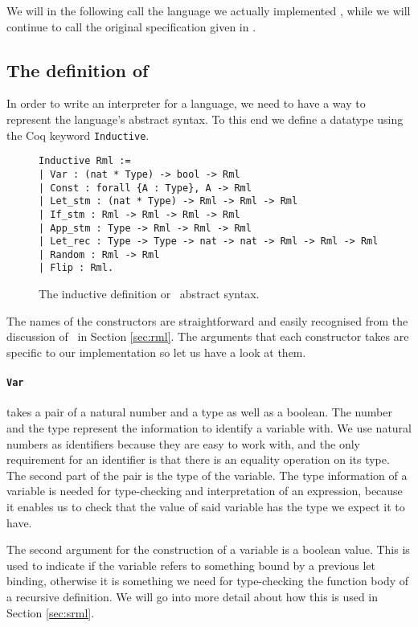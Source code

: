 \documentclass[11pt, leqno, titlepage]{article}
\def\coqe{\lstinline[language=Coq, basicstyle=\small]}
\theoremstyle{definition}
\begin{document}
We will in the following call the language we actually implemented \rmlx, while we
will continue to call the original specification given in \cite{rml-paper} \rml. 

\subsection{The definition of \rmlx}
\label{sec:rmlx}

In order to write an interpreter for a language, we need to have a way to represent
the language's abstract syntax. To this end we define a datatype using the Coq
keyword \coqe{Inductive}. 

\begin{figure}[h]
  \centering
  \begin{minipage}{0.8\linewidth}
    \begin{lstlisting}[language=coq]
Inductive Rml :=
| Var : (nat * Type) -> bool -> Rml 
| Const : forall {A : Type}, A -> Rml
| Let_stm : (nat * Type) -> Rml -> Rml -> Rml
| If_stm : Rml -> Rml -> Rml -> Rml
| App_stm : Type -> Rml -> Rml -> Rml
| Let_rec : Type -> Type -> nat -> nat -> Rml -> Rml -> Rml
| Random : Rml -> Rml
| Flip : Rml.
    \end{lstlisting}
  \end{minipage}
  \caption{The inductive definition or \rmlx\ abstract syntax.}
  \label{fig:rmlx}
\end{figure}


The names of the constructors are straightforward and easily recognised from the
discussion of \rml\ in Section \ref{sec:rml}. The arguments that each constructor
takes are specific to our implementation so let us have a look at them.

\paragraph{\coqe{Var}} takes a pair of a natural number and a type as well as a boolean. 
The number and the type represent the information to identify a variable with. We use
natural numbers as identifiers because they are easy to work with, and the only
requirement for an identifier is that there is an equality operation on its type. The
second part of the pair is the type of the variable. The type information of a
variable is needed for type-checking and interpretation of an expression, because it
enables us to check that the value of said variable has the type we expect it to
have.

The second argument for the construction of a variable is a boolean value. This is
used to indicate if the variable refers to something bound by a previous let binding,
otherwise it is something we need for type-checking the function body of a recursive
definition. We will go into more detail about how this is used in Section \ref{sec:srml}.
\end{document}
